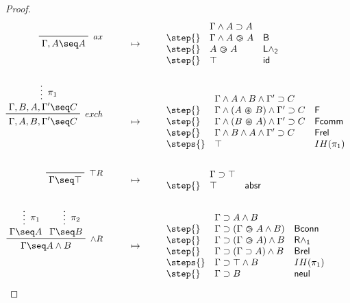 \begin{proof}
  \begin{align*}
    \R[ax]
      {\Gamma, A \seq A}
    &\mt
    \begin{array}{lll}
            & \Gamma \land A \limp A & \\
      \step{} & \Gamma \land A \back A & \mathsf{B} \\
      \step{} & A \back A & \mathsf{L\land_2} \\
      \step{} & \top & \mathsf{id}
    \end{array}
    \\\\
    \R[exch]
      {\summ[$\pi_1$]{\Gamma, B, A, \Gamma' \seq C}}
      {\Gamma, A, B, \Gamma' \seq C}
    &\mt
    \begin{array}{lll}
            & \Gamma \land A \land B \land \Gamma' \limp C & \\
      \step{} & \Gamma \land (A \forw B) \land \Gamma' \limp C & \mathsf{F} \\
      \step{} & \Gamma \land (B \forw A) \land \Gamma' \limp C & \mathsf{Fcomm} \\
      \step{} & \Gamma \land B \land A \land \Gamma' \limp C & \mathsf{Frel} \\
      \steps{} & \top & IH(\pi_1)
    \end{array}
    \\\\
    \R[\top R]
      {}
      {\Gamma \seq \top}
    &\mt
    \begin{array}{lll}
            & \Gamma \limp \top & \\
      \step{} & \top & \mathsf{absr}
    \end{array}
    \\\\
    \R[\land R]
      {\summ[$\pi_1$]{\Gamma \seq A}}
      {\summ[$\pi_2$]{\Gamma \seq B}}
      {\Gamma \seq A \land B}
    &\mt
    \begin{array}{lll}
            & \Gamma \limp A \land B & \\
      \step{} & \Gamma \limp (\Gamma \back A \land B) & \mathsf{Bconn} \\
      \step{} & \Gamma \limp (\Gamma \back A) \land B & \mathsf{R\land_1} \\
      \step{} & \Gamma \limp (\Gamma \limp A) \land B & \mathsf{Brel} \\
      \steps{} & \Gamma \limp \top \land B & IH(\pi_1) \\
      \step{} & \Gamma \limp B & \mathsf{neul} \\

\end{array}
\end{align*}
\end{proof}
